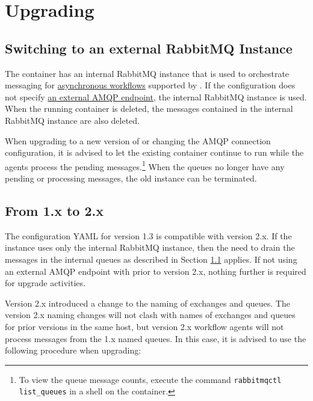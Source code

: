\chapter{Upgrading}

\section{Switching to an external RabbitMQ Instance}\label{sec:rmq-switch}

The \cxoneflow container has an internal RabbitMQ instance that is used to orchestrate messaging 
for \hyperref[part:workflows]{asynchronous workflows} supported by \cxoneflow.  If the configuration
does not specify \hyperref[sec:yaml-config]{an external AMQP endpoint}, the internal RabbitMQ instance
is used.  When the running \cxoneflow container is deleted, the messages contained in the internal
RabbitMQ instance are also deleted.

When upgrading to a new version of \cxoneflow or changing the AMQP connection configuration, it is advised
to let the existing \cxoneflow container continue to run while the agents process the pending messages.\footnote{To view 
the queue message counts, execute the command \texttt{rabbitmqctl list\_queues} in a shell on the \cxoneflow container.}  
When the queues no longer have any pending or processing messages, the old \cxoneflow instance can be terminated.

\section{From 1.x to 2.x}

The configuration YAML for version 1.3 is compatible with version 2.x.  If the \cxoneflow instance uses only the internal
RabbitMQ instance, then the need to drain the messages in the internal queues as described in Section \ref{sec:rmq-switch}
applies.  If not using an external AMQP endpoint with \cxoneflow prior to version 2.x, nothing further is required for 
upgrade activities.

Version 2.x introduced a change to the naming of exchanges and queues.  The version 2.x naming changes will not clash with
names of exchanges and queues for prior versions in the same host, but version 2.x workflow agents will not process messages
from the 1.x named queues.  In this case, it is advised to use the following procedure when upgrading:

